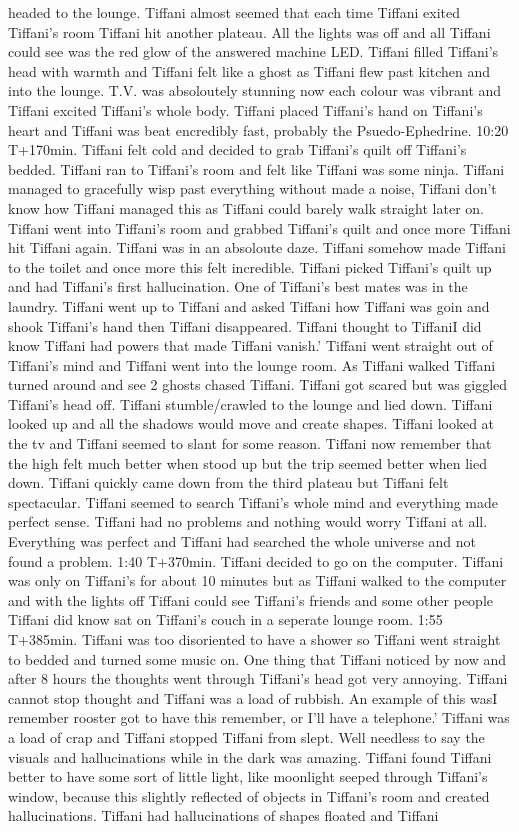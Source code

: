 \documentclass[12pt]{book}
\begin{document}
headed to the lounge. Tiffani almost seemed that each time Tiffani exited Tiffani's room Tiffani hit another plateau. All the lights was off and all Tiffani could see was the red glow of the answered machine LED. Tiffani filled Tiffani's head with warmth and Tiffani felt like a ghost as Tiffani flew past kitchen and into the lounge. T.V. was absoloutely stunning now each colour was vibrant and Tiffani excited Tiffani's whole body. Tiffani placed Tiffani's hand on Tiffani's heart and Tiffani was beat encredibly fast, probably the Psuedo-Ephedrine. 10:20 T+170min. Tiffani felt cold and decided to grab Tiffani's quilt off Tiffani's bedded. Tiffani ran to Tiffani's room and felt like Tiffani was some ninja. Tiffani managed to gracefully wisp past everything without made a noise, Tiffani don't know how Tiffani managed this as Tiffani could barely walk straight later on. Tiffani went into Tiffani's room and grabbed Tiffani's quilt and once more Tiffani hit Tiffani again. Tiffani was in an absoloute daze. Tiffani somehow made Tiffani to the toilet and once more this felt incredible. Tiffani picked Tiffani's quilt up and had Tiffani's first hallucination. One of Tiffani's best mates was in the laundry. Tiffani went up to Tiffani and asked Tiffani how Tiffani was goin and shook Tiffani's hand then Tiffani disappeared. Tiffani thought to TiffaniI did know Tiffani had powers that made Tiffani vanish.' Tiffani went straight out of Tiffani's mind and Tiffani went into the lounge room. As Tiffani walked Tiffani turned around and see 2 ghosts chased Tiffani. Tiffani got scared but was giggled Tiffani's head off. Tiffani stumble/crawled to the lounge and lied down. Tiffani looked up and all the shadows would move and create shapes. Tiffani looked at the tv and Tiffani seemed to slant for some reason. Tiffani now remember that the high felt much better when stood up but the trip seemed better when lied down. Tiffani quickly came down from the third plateau but Tiffani felt spectacular. Tiffani seemed to search Tiffani's whole mind and everything made perfect sense. Tiffani had no problems and nothing would worry Tiffani at all. Everything was perfect and Tiffani had searched the whole universe and not found a problem. 1:40 T+370min. Tiffani decided to go on the computer. Tiffani was only on Tiffani's for about 10 minutes but as Tiffani walked to the computer and with the lights off Tiffani could see Tiffani's friends and some other people Tiffani did know sat on Tiffani's couch in a seperate lounge room. 1:55 T+385min. Tiffani was too disoriented to have a shower so Tiffani went straight to bedded and turned some music on. One thing that Tiffani noticed by now and after 8 hours the thoughts went through Tiffani's head got very annoying. Tiffani cannot stop thought and Tiffani was a load of rubbish. An example of this wasI remember rooster got to have this remember, or I'll have a telephone.' Tiffani was a load of crap and Tiffani stopped Tiffani from slept. Well needless to say the visuals and hallucinations while in the dark was amazing. Tiffani found Tiffani better to have some sort of little light, like moonlight seeped through Tiffani's window, because this slightly reflected of objects in Tiffani's room and created hallucinations. Tiffani had hallucinations of shapes floated and Tiffani 
\end{document}
